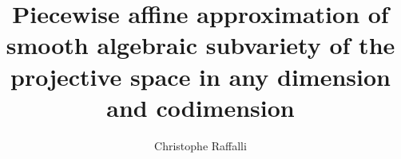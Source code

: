 \usepackage{hyperref}
\usepackage{enumerate}
\usepackage{enumitem}
\usepackage{amssymb,amsmath,amsthm} %
\usepackage[mathletters]{ucs}
\usepackage{tikz}
\usepackage[utf8x]{inputenc}
\usepackage{graphicx}
\usepackage{stmaryrd}
\usepackage[autosize]{dot2texi}
\usepackage{multicol}
\setlength{\multicolsep}{0pt}
\usepackage{tikz}
\usetikzlibrary{shapes,arrows,tikzmark,decorations.pathreplacing,calc}
\usepackage{adjustbox}


\title{Piecewise affine approximation of smooth algebraic subvariety of the
projective space in any dimension and codimension}
\author{Christophe Raffalli}

\newcommand{\interior}[1]{%
  #1^{\mathrm{o}}%
}
\newcommand{\cardinal}[1]{%
  \#({#1})%
}
\newcommand{\hull}[1]{%
  \mathcal H({#1})%
}
\newcommand{\nhull}[2]{%
  \mathcal H^\nabla({#1},{#2})%
}
\newcommand{\cone}[1]{%
  \mathcal C({#1})%
}
\newcommand{\ncone}[2]{%
  \mathcal C^\nabla({#1},{#2})%
}
\newcommand{\vertices}[1]{%
  \mathcal V({#1})%
}
\newcommand{\ball}[2]{%
  \mathcal B_{#2}({#1})%
}
\newcommand{\cball}[2]{%
  \mathcal Bᶜ_{#2}({#1})%
}

\newcommand{\PNR}{{\cal P}^n(ℝ)}
\newcommand{\SNR}{{\cal S}^n(ℝ)}
\newcommand{\sgn}{\mathrm{sgn}}

\newtheorem{theo}{Theorem}
\newtheorem{coro}[theo]{Corollary}
\newtheorem{nota}[theo]{Notation}
\newtheorem{defi}[theo]{Definition}
\newtheorem{prop}[theo]{Proposition}
\newtheorem{exam}[theo]{Example}
\newtheorem{lemm}[theo]{Lemma}
